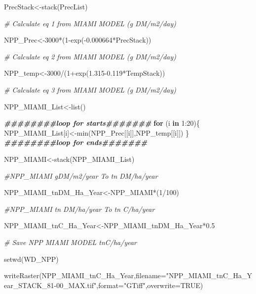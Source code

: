 \documentclass[
  10pt,
  b5paper,
]{book}
\newenvironment{Shaded}{\begin{snugshade}}{\end{snugshade}}
\newcommand{\AttributeTok}[1]{\textcolor[rgb]{0.77,0.63,0.00}{#1}}
\newcommand{\CommentTok}[1]{\textcolor[rgb]{0.56,0.35,0.01}{\textit{#1}}}
\newcommand{\ConstantTok}[1]{\textcolor[rgb]{0.00,0.00,0.00}{#1}}
\newcommand{\ControlFlowTok}[1]{\textcolor[rgb]{0.13,0.29,0.53}{\textbf{#1}}}
\newcommand{\DecValTok}[1]{\textcolor[rgb]{0.00,0.00,0.81}{#1}}
\newcommand{\DocumentationTok}[1]{\textcolor[rgb]{0.56,0.35,0.01}{\textbf{\textit{#1}}}}
\newcommand{\FloatTok}[1]{\textcolor[rgb]{0.00,0.00,0.81}{#1}}
\newcommand{\FunctionTok}[1]{\textcolor[rgb]{0.00,0.00,0.00}{#1}}
\newcommand{\NormalTok}[1]{#1}
\newcommand{\OtherTok}[1]{\textcolor[rgb]{0.56,0.35,0.01}{#1}}
\newcommand{\SpecialCharTok}[1]{\textcolor[rgb]{0.00,0.00,0.00}{#1}}
\newcommand{\StringTok}[1]{\textcolor[rgb]{0.31,0.60,0.02}{#1}}
\begin{document}
\begin{Shaded}
\begin{Highlighting}[]
\NormalTok{PrecStack}\OtherTok{\textless{}{-}}\FunctionTok{stack}\NormalTok{(PrecList)}

\CommentTok{\# Calculate eq 1 from MIAMI MODEL (g DM/m2/day)}

\NormalTok{NPP\_Prec}\OtherTok{\textless{}{-}}\DecValTok{3000}\SpecialCharTok{*}\NormalTok{(}\DecValTok{1}\SpecialCharTok{{-}}\FunctionTok{exp}\NormalTok{(}\SpecialCharTok{{-}}\FloatTok{0.000664}\SpecialCharTok{*}\NormalTok{PrecStack))}

\CommentTok{\# Calculate eq 2 from MIAMI MODEL (g DM/m2/day)}

\NormalTok{NPP\_temp}\OtherTok{\textless{}{-}}\DecValTok{3000}\SpecialCharTok{/}\NormalTok{(}\DecValTok{1}\SpecialCharTok{+}\FunctionTok{exp}\NormalTok{(}\FloatTok{1.315{-}0.119}\SpecialCharTok{*}\NormalTok{TempStack))}

\CommentTok{\# Calculate eq 3 from MIAMI MODEL (g DM/m2/day)}

\NormalTok{NPP\_MIAMI\_List}\OtherTok{\textless{}{-}}\FunctionTok{list}\NormalTok{()}

\DocumentationTok{\#\#\#\#\#\#\#\#loop for starts\#\#\#\#\#\#\#}
\ControlFlowTok{for}\NormalTok{ (i }\ControlFlowTok{in} \DecValTok{1}\SpecialCharTok{:}\DecValTok{20}\NormalTok{)\{}
\NormalTok{NPP\_MIAMI\_List[i]}\OtherTok{\textless{}{-}}\FunctionTok{min}\NormalTok{(NPP\_Prec[[i]],NPP\_temp[[i]])}
\NormalTok{\}}
\DocumentationTok{\#\#\#\#\#\#\#\#loop for ends\#\#\#\#\#\#\#}


\NormalTok{NPP\_MIAMI}\OtherTok{\textless{}{-}}\FunctionTok{stack}\NormalTok{(NPP\_MIAMI\_List)}

\CommentTok{\#NPP\_MIAMI gDM/m2/year To tn DM/ha/year}

\NormalTok{NPP\_MIAMI\_tnDM\_Ha\_Year}\OtherTok{\textless{}{-}}\NormalTok{NPP\_MIAMI}\SpecialCharTok{*}\NormalTok{(}\DecValTok{1}\SpecialCharTok{/}\DecValTok{100}\NormalTok{)}

\CommentTok{\#NPP\_MIAMI tn DM/ha/year To tn C/ha/year}

\NormalTok{NPP\_MIAMI\_tnC\_Ha\_Year}\OtherTok{\textless{}{-}}\NormalTok{NPP\_MIAMI\_tnDM\_Ha\_Year}\SpecialCharTok{*}\FloatTok{0.5}

\CommentTok{\# Save NPP MIAMI MODEL tnC/ha/year}

\FunctionTok{setwd}\NormalTok{(WD\_NPP)}

\FunctionTok{writeRaster}\NormalTok{(NPP\_MIAMI\_tnC\_Ha\_Year,}\AttributeTok{filename=}\StringTok{"NPP\_MIAMI\_tnC\_Ha\_Year\_STACK\_81{-}00\_MAX.tif"}\NormalTok{,}\AttributeTok{format=}\StringTok{"GTiff"}\NormalTok{,}\AttributeTok{overwrite=}\ConstantTok{TRUE}\NormalTok{)}


\end{Highlighting}
\end{Shaded}
\end{document}
